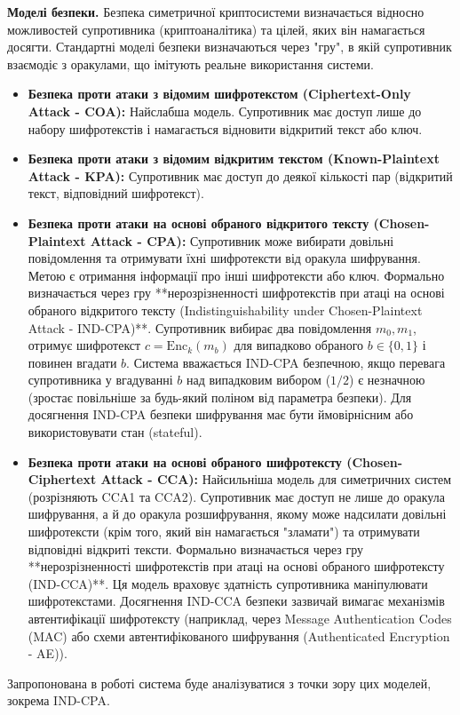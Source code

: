 \documentclass[a4paper,12pt]{article}
\begin{document}
    \textbf{Моделі безпеки.} Безпека симетричної криптосистеми визначається відносно можливостей супротивника (криптоаналітика) та цілей, яких він намагається досягти. Стандартні моделі безпеки визначаються через "гру", в якій супротивник взаємодіє з оракулами, що імітують реальне використання системи.
    \begin{itemize}
        \item \textbf{Безпека проти атаки з відомим шифротекстом (Ciphertext-Only Attack - COA):} Найслабша модель. Супротивник має доступ лише до набору шифротекстів і намагається відновити відкритий текст або ключ.
        \item \textbf{Безпека проти атаки з відомим відкритим текстом (Known-Plaintext Attack - KPA):} Супротивник має доступ до деякої кількості пар (відкритий текст, відповідний шифротекст).
        \item \textbf{Безпека проти атаки на основі обраного відкритого тексту (Chosen-Plaintext Attack - CPA):} Супротивник може вибирати довільні повідомлення та отримувати їхні шифротексти від оракула шифрування. Метою є отримання інформації про інші шифротексти або ключ. Формально визначається через гру **нерозрізненності шифротекстів при атаці на основі обраного відкритого тексту (Indistinguishability under Chosen-Plaintext Attack - IND-CPA)**. Супротивник вибирає два повідомлення \(m_0, m_1\), отримує шифротекст \(c = \text{Enc}_k(m_b)\) для випадково обраного \(b \in \{0, 1\}\) і повинен вгадати \(b\). Система вважається IND-CPA безпечною, якщо перевага супротивника у вгадуванні \(b\) над випадковим вибором (\(1/2\)) є незначною (зростає повільніше за будь-який поліном від параметра безпеки). Для досягнення IND-CPA безпеки шифрування має бути ймовірнісним або використовувати стан (stateful).
        \item \textbf{Безпека проти атаки на основі обраного шифротексту (Chosen-Ciphertext Attack - CCA):} Найсильніша модель для симетричних систем (розрізняють CCA1 та CCA2). Супротивник має доступ не лише до оракула шифрування, а й до оракула розшифрування, якому може надсилати довільні шифротексти (крім того, який він намагається "зламати") та отримувати відповідні відкриті тексти. Формально визначається через гру **нерозрізненності шифротекстів при атаці на основі обраного шифротексту (IND-CCA)**. Ця модель враховує здатність супротивника маніпулювати шифротекстами. Досягнення IND-CCA безпеки зазвичай вимагає механізмів автентифікації шифротексту (наприклад, через Message Authentication Codes (MAC) або схеми автентифікованого шифрування (Authenticated Encryption - AE)).
    \end{itemize}
    Запропонована в роботі система буде аналізуватися з точки зору цих моделей, зокрема IND-CPA.
\end{document}
